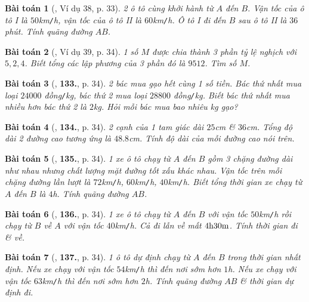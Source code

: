 \documentclass{article}
\newtheorem{baitoan}{Bài toán}
\begin{document}
\begin{baitoan}[\cite{Tuyen_Toan_7}, Ví dụ 38, p. 33]
	2 ô tô cùng khởi hành từ $A$ đến $B$. Vận tốc của ô tô I là $50$\emph{km\texttt{/}h}, vận tốc của ô tô II là $60$\emph{km\texttt{/}h}. Ô tô I đi đến $B$ sau ô tô II là $36$ phút. Tính quãng đường $AB$.
\end{baitoan}

\begin{baitoan}[\cite{Tuyen_Toan_7}, Ví dụ 39, p. 34]
	1 số $M$ được chia thành 3 phần tỷ lệ nghịch với $5,2,4$. Biết tổng các lập phương của 3 phần đó là $9512$. Tìm số $M$.
\end{baitoan}

\begin{baitoan}[\cite{Tuyen_Toan_7}, \textbf{133.}, p. 34]
	2 bác mua gạo hết cùng 1 số tiền. Bác thứ nhất mua loại $24000$ \emph{đồng\texttt{/}kg}, bác thứ 2 mua loại $28800$ \emph{đồng\texttt{/}kg}. Biết bác thứ nhất mua nhiều hơn bác thứ 2 là $2$\emph{kg}. Hỏi mỗi bác mua bao nhiêu \emph{kg} gạo?
\end{baitoan}

\begin{baitoan}[\cite{Tuyen_Toan_7}, \textbf{134.}, p. 34]
	2 cạnh của 1 tam giác dài $25$\emph{cm} \& $36$\emph{cm}. Tổng độ dài 2 đường cao tương ứng là $48.8$\emph{cm}. Tính độ dài của mỗi đường cao nói trên.
\end{baitoan}

\begin{baitoan}[\cite{Tuyen_Toan_7}, \textbf{135.}, p. 34]
	1 xe ô tô chạy từ $A$ đến $B$ gồm 3 chặng đường dài như nhau nhưng chất lượng mặt đường tốt xấu khác nhau. Vận tốc trên mỗi chặng đường lần lượt là $72$\emph{km\texttt{/}h}, $60$\emph{km\texttt{/}h}, $40$\emph{km\texttt{/}h}. Biết tổng thời gian xe chạy từ $A$ đến $B$ là $4$\emph{h}. Tính quãng đường $AB$.
\end{baitoan}

\begin{baitoan}[\cite{Tuyen_Toan_7}, \textbf{136.}, p. 34]	
	1 xe ô tô chạy từ $A$ đến $B$ với vận tốc $50$\emph{km\texttt{/}h} rồi chạy từ $B$ về $A$ với vận tốc $40$\emph{km\texttt{/}h}. Cả đi lẫn về mất $\rm4h30m$. Tính thời gian đi \& về.
\end{baitoan}

\begin{baitoan}[\cite{Tuyen_Toan_7}, \textbf{137.}, p. 34]
	1 ô tô dự định chạy từ $A$ đến $B$ trong thời gian nhất định. Nếu xe chạy với vận tốc $54$\emph{km\texttt{/}h} thì đến nơi sớm hơn $1$\emph{h}. Nếu xe chạy với vận tốc $63$\emph{km\texttt{/}h} thì đến nơi sớm hơn $2$\emph{h}. Tính quãng đường $AB$ \& thời gian dự định đi.
\end{baitoan}
\end{document}
